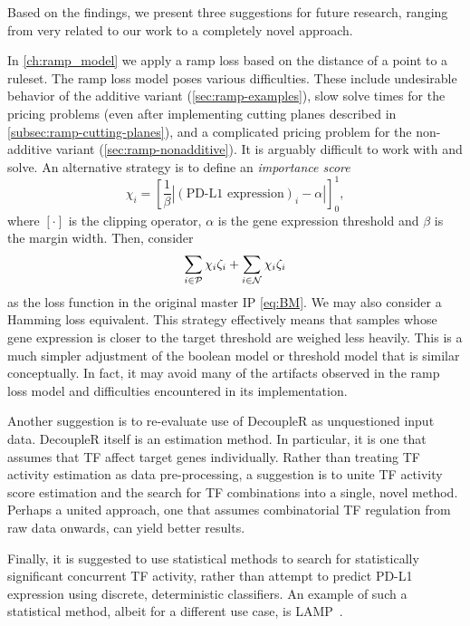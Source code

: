 Based on the findings, we present three suggestions for future research, ranging from very related to our work to
a completely novel approach.

In \autoref{ch:ramp_model} we apply a ramp loss based on the distance of a point to a ruleset.
The ramp loss model poses various difficulties.
These include undesirable behavior of the additive variant (\autoref{sec:ramp-examples}),
slow solve times for the pricing problems (even after implementing cutting planes described in \autoref{subsec:ramp-cutting-planes}),
and a complicated pricing problem for the non-additive variant (\autoref{sec:ramp-nonadditive}).
It is arguably difficult to work with and solve.
An alternative strategy is to define an \textit{importance score}
\[
    \chi_i = \left[\frac{1}{\beta}|(\text{PD-L1 expression})_i - \alpha|\right]_0^1,
\]
where $[\cdot]$ is the clipping operator, $\alpha$ is the gene expression threshold and $\beta$ is the margin width.
Then, consider
\[
    \sum_{i \in \mathcal{P}}\chi_i \zeta_i + \sum_{i \in \mathcal{N}} \chi_i \zeta_i
\]
as the loss function in the original master IP \eqref{eq:BM}.
We may also consider a Hamming loss equivalent.
This strategy effectively means that samples whose gene expression is closer to the target threshold are weighed less heavily.
This is a much simpler adjustment of the boolean model or threshold model that is similar conceptually.
In fact, it may avoid many of the artifacts observed in the ramp loss model and difficulties encountered in its implementation.

Another suggestion is to re-evaluate use of DecoupleR as unquestioned input data.
DecoupleR itself is an estimation method.
In particular, it is one that assumes that TF affect target genes individually.
Rather than treating TF activity estimation as data pre-processing,
a suggestion is to unite TF activity score estimation and the search for TF combinations into a single, novel method.
Perhaps a united approach, one that assumes combinatorial TF regulation from raw data onwards, can yield better results.

Finally, it is suggested to use statistical methods to search for statistically significant concurrent TF activity,
rather than attempt to predict PD-L1 expression using discrete, deterministic classifiers.
An example of such a statistical method, albeit for a different use case, is LAMP~\cite{terada_statistical_2013}.